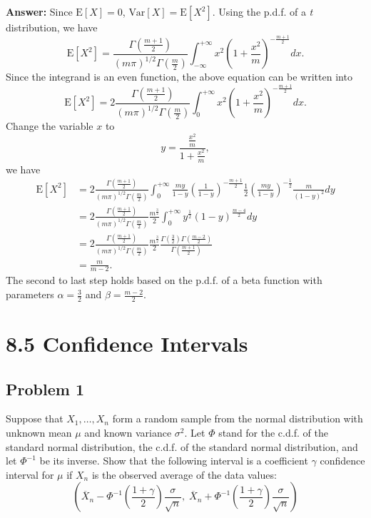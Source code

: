 \documentclass{article}
\begin{document}
\textbf{Answer:} Since $\text{E}[X] = 0$, $\text{Var}[X] = \text{E}[X^2]$. Using the p.d.f. of a \textit{t} distribution, we have
\begin{equation*}
\text{E}[X^2] = \frac{\Gamma(\frac{m+1}{2})}{(m\pi)^{1/2} \Gamma(\frac{m}{2})} \int_{-\infty}^{+\infty} x^2 (1 + \frac{x^2}{m})^{-\frac{m+1}{2}} dx.
\end{equation*}
Since the integrand is an even function, the above equation can be written into
\begin{equation*}
\text{E}[X^2] = 2 \frac{\Gamma(\frac{m+1}{2})}{(m\pi)^{1/2} \Gamma(\frac{m}{2})} \int_0^{+\infty} x^2 (1 + \frac{x^2}{m})^{-\frac{m+1}{2}} dx.
\end{equation*}
Change the variable $x$ to 
\begin{equation*}
y = \frac{\frac{x^2}{m}}{1+\frac{x^2}{m}},
\end{equation*}
we have
\begin{align*}
\text{E}[X^2] &= 2 \frac{\Gamma(\frac{m+1}{2})}{(m\pi)^{1/2} \Gamma(\frac{m}{2})} \int_0^{+\infty} \frac{my}{1-y} (\frac{1}{1 - y})^{-\frac{m+1}{2}} \frac{1}{2} (\frac{my}{1 - y})^{-\frac{1}{2}} \frac{m}{(1 - y)^2} dy \\
&= 2 \frac{\Gamma(\frac{m+1}{2})}{(m\pi)^{1/2} \Gamma(\frac{m}{2})} \frac{m^{\frac{3}{2}}}{2} \int_0^{+\infty} y^{\frac{1}{2}} (1 - y)^{\frac{m-4}{2}} dy \\
&= 2 \frac{\Gamma(\frac{m+1}{2})}{(m\pi)^{1/2} \Gamma(\frac{m}{2})} \frac{m^{\frac{3}{2}}}{2} \frac{\Gamma(\frac{3}{2}) \Gamma(\frac{m - 2}{2})}{\Gamma(\frac{m + 1}{2})} \\
&= \frac{m}{m - 2}.
\end{align*}
The second to last step holds based on the p.d.f. of a beta function with parameters $\alpha = \frac{3}{2}$ and $\beta = \frac{m - 2}{2}$.


\newpage

\section*{8.5 Confidence Intervals}
\subsection*{Problem 1}
Suppose that $X_1, \dots, X_n$ form a random sample from the normal distribution with unknown mean $\mu$ and known variance $\sigma^2$. Let $\Phi$ stand for the c.d.f. of the standard normal distribution, the c.d.f. of the standard normal distribution, and let $\Phi^{-1}$ be its inverse. Show that the following interval is a coefficient $\gamma$ confidence interval for $\mu$ if $X_n$ is the observed average of the data values:
\begin{equation*}
(\overline{X}_n - \Phi^{-1} \left(\frac{1 + \gamma}{2} \right) \frac{\sigma}{\sqrt{n}}, \; \overline{X}_n + \Phi^{-1} \left(\frac{1 + \gamma}{2} \right) \frac{\sigma}{\sqrt{n}})
\end{equation*}
\end{document}
